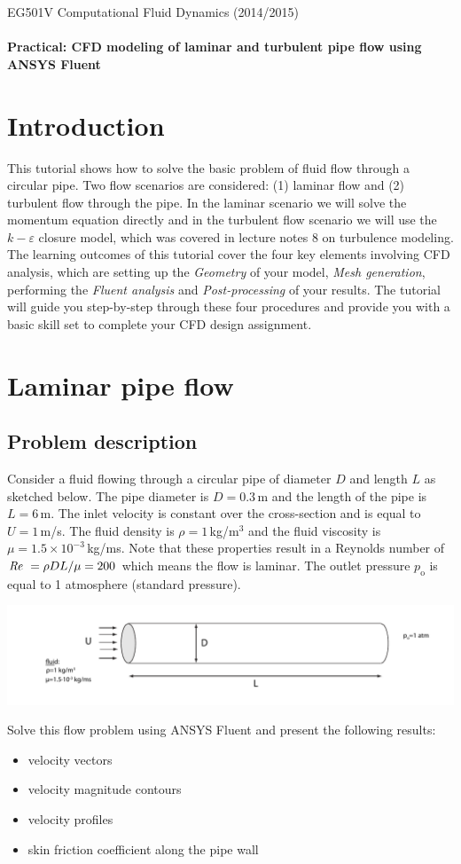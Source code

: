 \documentclass[11pt,a4paper,oneside]{scrartcl}
\newcommand\Rey{\mbox{\textit{Re}}\,\,}
\begin{document}
EG501V Computational Fluid Dynamics (2014/2015)
\\
\\
\textbf{Practical: CFD modeling of laminar and turbulent pipe flow using ANSYS Fluent}

\section{Introduction}
This tutorial shows how to solve the basic problem of fluid flow through a circular pipe. Two flow scenarios are considered: (1) laminar flow and (2) turbulent flow  through the pipe. In the laminar scenario we will solve the momentum equation directly and in the turbulent flow scenario we will use the $k-\varepsilon$ closure model, which was covered in lecture notes 8 on turbulence modeling.  The learning outcomes of this tutorial cover the four key elements involving  CFD analysis, which are setting up the \emph{Geometry} of your model, \emph{Mesh generation}, performing the \emph{Fluent analysis}  and \emph{Post-processing} of your results. The tutorial will guide you step-by-step through these four procedures and provide you with a basic skill set to complete your CFD design assignment.

\section{Laminar pipe flow}

\subsection{Problem description}
Consider a fluid flowing through a circular pipe of diameter $D$ and length $L$ as sketched below. The pipe diameter is $D=0.3$\,m and the length of the pipe is $L=6$\,m. The inlet velocity  is constant over the cross-section and is equal to $U=1$\,m/s. The  fluid density is $\rho=1$\,kg/m$^3$ and the fluid viscosity is $\mu=1.5\times10^{-3}$\,kg/ms. Note that these properties result in a Reynolds number of $\Rey=\rho DL/\mu=200$ which means the flow is laminar. The outlet pressure $p_\mathrm{o}$ is equal to 1 atmosphere (standard pressure).\\
\begin{center}
\includegraphics[width=\textwidth,clip]{pipe_sketch.pdf}
\end{center}
Solve this flow problem using ANSYS Fluent and present the following results:
\begin{itemize}
\item velocity vectors
\item velocity magnitude contours
\item velocity profiles
\item skin friction coefficient along the pipe wall
\end{itemize}
\end{document}
